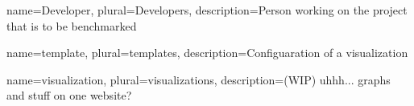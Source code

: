 \makenoidxglossaries

{
	name=Developer,
	plural=Developers,
	description={Person working on the project that is to be benchmarked}
}

{
	name=template,
	plural=templates,
	description={Configuaration of a visualization}
}

{
	name=visualization,
	plural=visualizations,
	description={(WIP) uhhh... graphs and stuff on one website?}
}

